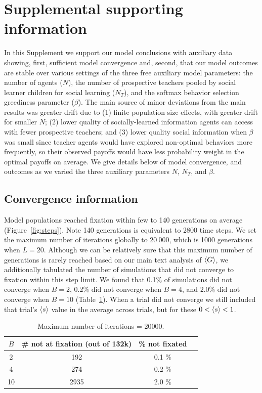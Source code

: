 \documentclass[letterpaper,11.5pt]{scrartcl}
\begin{document}
\newpage


\section{Supplemental supporting information}

In this Supplement we support our model conclusions with auxiliary data
showing, first, sufficient model convergence and, second, that our model
outcomes are stable over various settings of the three free auxiliary model
parameters: the number of agents ($N$), the number of
prospective teachers pooled by social learner children for social learning
($N_T$), and the softmax behavior selection greediness parameter ($\beta$).
The main source of minor deviations from the main results was greater drift
due to (1) finite population size effects, with greater drift for smaller $N$;
(2) lower quality of socially-learned information agents can access with fewer
prospective teachers; and (3) lower quality social information when $\beta$
was small since teacher agents would have explored non-optimal behaviors more
frequently, so their observed payoffs would have less probability weight in
the optimal payoffs on average. We give details below of model convergence, and
outcomes as we varied the three auxiliary parameters $N$, $N_T$, and $\beta$.


\subsection{Convergence information}

Model populations reached fixation within few to 140 generations on
average (Figure~\ref{fig:steps}).
Note 140 generations is equivalent to 2800 time steps. We set the maximum 
number of iterations globally to $20~000$, which is 1000 generations when
$L=20$. Although we can be relatively sure that this maximum number of 
generations is rarely reached based on our main text analysis of $\langle G \rangle$,
we additionally tabulated the number of simulations that did not converge to
fixation
within this step limit. We found that 0.1\% of simulations did not converge
when $B=2$, 0.2\% did not converge when $B=4$, and 2.0\% did not converge
when $B=10$ (Table~\ref{tab:convergence}). When a trial did not converge we
still included that trial's $\langle s \rangle$ value in the average across trials,
but for these $0 < \langle s \rangle < 1$.

\begin{table}[h] \caption{Maximum number of iterations = 20000.} \label{tab:convergence} \centering
  \begin{tabular}{cccc} 
    \toprule $B$ & \# not at fixation (out of 132k) & \% not fixated \\ 
    \midrule  2  & 192  & 0.1 \% \\ 
              4  & 274  & 0.2 \% \\ 
              10 & 2935 & 2.0 \% \\ 
    \bottomrule \end{tabular} 
\end{table}
\end{document}

